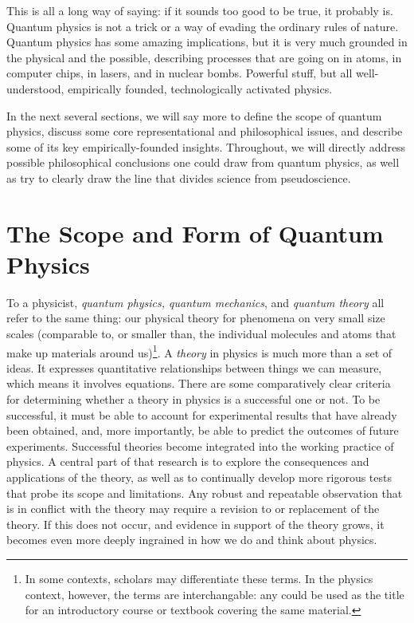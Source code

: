 \documentclass[onecolumn,preprintnumbers,amsmath,amssymbn,reprint,nofootinbib,superscriptaddress]{revtex4}    %
\begin{document}
This is all a long way of saying:  if it sounds too good to be true, it probably is. Quantum physics is not a trick or a way of evading the ordinary rules of nature.  Quantum physics has some amazing implications, but it is very much grounded in the physical and the possible, describing processes that are going on in atoms, in computer chips, in lasers, and in nuclear bombs.  Powerful stuff, but all well-understood, empirically founded, technologically activated physics. 

In the next several sections, we will say more to define the scope of quantum physics, discuss some core representational and philosophical issues, and describe some of its key empirically-founded insights.  Throughout, we will directly address possible philosophical conclusions one could draw from quantum physics, as well as try to clearly draw the line that divides science from pseudoscience.  


\section{The Scope and Form of Quantum Physics}

To a physicist, {\em quantum physics, quantum mechanics}, and {\em quantum theory} all refer to the same thing:  our physical theory for phenomena on very small size scales (comparable to, or smaller than, the individual molecules and atoms that make up materials around us)\footnote{In some contexts, scholars may differentiate these terms.  In the physics context, however, the terms are interchangable: any could be used as the title for an introductory course or textbook covering the same material.}.  A {\em theory} in physics is much more than a set of ideas.  It expresses quantitative relationships between things we can measure, which means it involves equations. There are some comparatively clear criteria for determining whether a theory in physics is a successful one or not.  To be successful, it must be able to account for experimental results that have already been obtained, and, more importantly, be able to predict the outcomes of future experiments. Successful theories become integrated into the working practice of physics. A central part of that research is to explore the consequences and applications of the theory, as well as to continually develop more rigorous tests that probe its scope and limitations.  Any robust and repeatable observation that is in conflict with the theory may require a revision to or replacement of the theory. If this does not occur, and evidence in support of the theory grows, it becomes even more deeply ingrained in how we do and think about physics.
\end{document}
